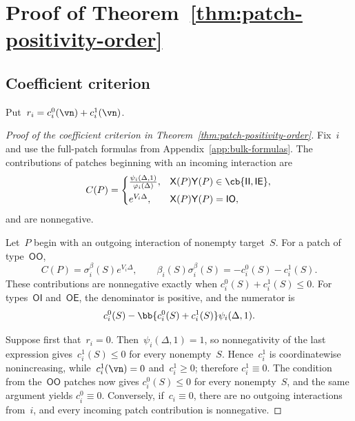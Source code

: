 \section{Proof of Theorem~\ref{thm:patch-positivity-order}}
\label{sec:patch-positivity}

\subsection{Coefficient criterion}
\label{subsec:positivity-criterion}

Put~$r_i=c_i^0(\vn)+c_i^1(\vn)$.

\begin{proof}[Proof of the coefficient criterion in
Theorem~\ref{thm:patch-positivity-order}]
Fix~$i$ and use the full-patch formulas from
Appendix~\ref{app:bulk-formulas}. The contributions of patches beginning with
an incoming interaction are
\begin{equation*}
C(P)
=
\begin{cases}
\frac{\psi_i(\Delta,1)}{\varphi_i(\Delta)},
&\mathsf X(P)\mathsf Y(P)\in\cb{\mathsf{II},\mathsf{IE}},
\\[0.4em]
e^{V_i\Delta},
&\mathsf X(P)\mathsf Y(P)=\mathsf{IO},
\end{cases}
\end{equation*}
and are nonnegative.

Let~$P$ begin with an outgoing interaction of nonempty target~$S$. For a patch
of type~$\mathsf{OO}$,
\begin{equation*}
C(P)=\sigma_i^\beta(S)e^{V_i\Delta},
\qquad
\beta_i(S)\sigma_i^\beta(S)=-c_i^0(S)-c_i^1(S).
\end{equation*}
These contributions are nonnegative exactly when
$c_i^0(S)+c_i^1(S)\leq0$. For types~$\mathsf{OI}$ and~$\mathsf{OE}$, the
denominator is positive, and the numerator is
\begin{equation*}
c_i^0(S)-\bb{c_i^0(S)+c_i^1(S)}\psi_i(\Delta,1).
\end{equation*}

Suppose first that~$r_i=0$. Then~$\psi_i(\Delta,1)=1$, so nonnegativity of the
last expression gives~$c_i^1(S)\leq0$ for every nonempty~$S$. Hence~$c_i^1$ is
coordinatewise nonincreasing, while~$c_i^1(\vn)=0$ and~$c_i^1\geq0$; therefore
$c_i^1\equiv0$. The condition from the~$\mathsf{OO}$ patches now gives
$c_i^0(S)\leq0$ for every nonempty~$S$, and the same argument yields
$c_i^0\equiv0$. Conversely, if~$c_i\equiv0$, there are no outgoing
interactions from~$i$, and every incoming patch contribution is nonnegative.


\end{proof}
